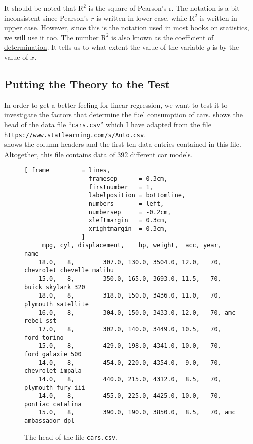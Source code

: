 It should be noted that $\mathrm{R}^2$ is the square of Pearson's \textrm{r}.  The notation is a bit
inconsistent since Pearson's $r$ is written in lower case, while $\mathrm{R}^2$ is written in upper
case.  However, since this is the notation used in most books on statistics, we will use it too.
The number $\mathrm{R}^2$ is also known as the
\href{https://en.wikipedia.org/wiki/Coefficient_of_determination}{coefficient of determination}.  It tells us 
to what extent the value of the variable $y$ is  by the value of $x$.


\subsection{Putting the Theory to the Test}
In order to get a better feeling for linear regression, we want to test it to investigate the factors that
determine the fuel consumption of cars.   shows the head of the data file 
``\href{https://github.com/karlstroetmann/Artificial-Intelligence/blob/master/SetlX/cars.csv}{\texttt{cars.csv}}''
which I have adapted from the file
\\[0.2cm]
\hspace*{1.3cm}
\href{https://www.statlearning.com/s/Auto.csv}{\texttt{https://www.statlearning.com/s/Auto.csv}}.
\\[0.2cm]
 shows the column headers and the first ten data entries contained in this file.  
Altogether, this file contains data of 392 different car models.

\begin{figure}[!ht]
\centering
\begin{Verbatim}[ frame         = lines, 
                  framesep      = 0.3cm, 
                  firstnumber   = 1,
                  labelposition = bottomline,
                  numbers       = left,
                  numbersep     = -0.2cm,
                  xleftmargin   = 0.3cm,
                  xrightmargin  = 0.3cm,
                ]
     mpg, cyl, displacement,    hp, weight,  acc, year, name
    18.0,   8,        307.0, 130.0, 3504.0, 12.0,   70, chevrolet chevelle malibu
    15.0,   8,        350.0, 165.0, 3693.0, 11.5,   70, buick skylark 320
    18.0,   8,        318.0, 150.0, 3436.0, 11.0,   70, plymouth satellite
    16.0,   8,        304.0, 150.0, 3433.0, 12.0,   70, amc rebel sst
    17.0,   8,        302.0, 140.0, 3449.0, 10.5,   70, ford torino
    15.0,   8,        429.0, 198.0, 4341.0, 10.0,   70, ford galaxie 500
    14.0,   8,        454.0, 220.0, 4354.0,  9.0,   70, chevrolet impala
    14.0,   8,        440.0, 215.0, 4312.0,  8.5,   70, plymouth fury iii
    14.0,   8,        455.0, 225.0, 4425.0, 10.0,   70, pontiac catalina
    15.0,   8,        390.0, 190.0, 3850.0,  8.5,   70, amc ambassador dpl
\end{Verbatim}
\vspace*{-0.3cm}
\caption{The head of the file \texttt{cars.csv}.}
\label{fig:cars.csv}
\end{figure}

